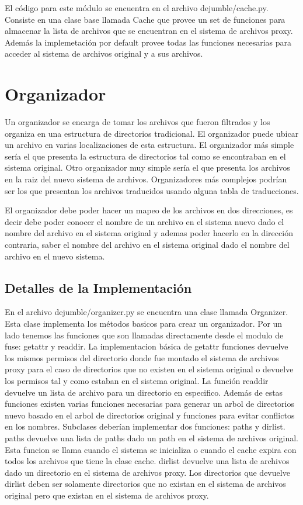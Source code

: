El código para este módulo se encuentra en el archivo dejumble/cache.py. Consiste en una clase base llamada Cache que provee un set de funciones para almacenar la lista de archivos que se encuentran en el sistema de archivos proxy. Además la implemetación por default provee todas las funciones necesarias para acceder al sistema de archivos original y a sus archivos. 


\section{Organizador}

Un organizador se encarga de tomar los archivos que fueron filtrados y los organiza en una estructura de directorios tradicional. El organizador puede ubicar un archivo en varias localizaciones de esta estructura. El organizador más simple sería el que presenta la estructura de directorios tal como se encontraban en el sistema original. Otro organizador muy simple sería el que presenta los archivos en la raiz del nuevo sistema de archivos. Organizadores más complejos podrían ser los que presentan los archivos traducidos usando alguna tabla de traducciones.

El organizador debe poder hacer un mapeo de los archivos en dos direcciones, es decir debe poder conocer el nombre de un archivo en el sistema nuevo dado el nombre del archivo en el sistema original y ademas poder hacerlo en la dirección contraria, saber el nombre del archivo en el sistema original dado el nombre del archivo en el nuevo sistema.

\subsection{Detalles de la Implementación}

En el archivo dejumble/organizer.py se encuentra una clase llamada Organizer. Esta clase implementa los métodos basicos para crear un organizador. Por un lado tenemos las funciones que son llamadas directamente desde el modulo de fuse: getattr y readdir. La implementacion básica de getattr funciones devuelve los mismos permisos del directorio donde fue montado el sistema de archivos proxy para el caso de directorios que no existen en el sistema original o devuelve los permisos tal y como estaban en el sistema original. La función readdir devuelve un lista de archivo para un directorio en especifico. Además de estas funciones existen varias funciones necesarias para generar un arbol de directorios nuevo basado en el arbol de directorios original y funciones para evitar conflictos en los nombres. Subclases deberían implementar dos funciones: paths y dirlist. paths devuelve una lista de paths dado un path en el sistema de archivos original. Esta funcion se llama cuando el sistema se inicializa o cuando el cache expira con todos los archivos que tiene la clase cache. dirlist devuelve una lista de archivos dado un directorio en el sistema de archivos proxy. Los directorios que devuelve dirlist deben ser solamente directorios que no existan en el sistema de archivos original pero que existan en el sistema de archivos proxy.


